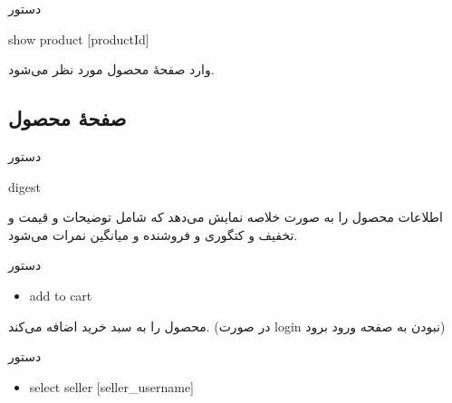 \documentclass[]{article}
\begin{document}
\begin{mybox}[colback=yellow]{دستور}

\begin{latin}

show product [productId]

\end{latin}

\end{mybox}

وارد صفحهٔ محصول مورد نظر می‌شود.

\newpage
\subsection*{{\titr صفحهٔ محصول}}



\begin{mybox}[colback=yellow]{دستور}

\begin{latin}

digest

\end{latin}

\end{mybox}

اطلاعات محصول را به صورت خلاصه نمایش می‌دهد که شامل توضیحات و قیمت و تخفیف و کتگوری و فروشنده و میانگین نمرات می‌شود.


\begin{mybox}[colback=brilliantlavender]{دستور}

\begin{latin}

\begin{itemize}[label = {$\Rightarrow$}]

\item
add to cart

\end{itemize}

\end{latin}

\end{mybox}

محصول را به سبد خرید اضافه می‌کند. (در صورت login نبودن به صفحه ورود برود)


\begin{mybox}[colback=brilliantlavender]{دستور}

\begin{latin}

\begin{itemize}[label = {$\Rightarrow$}]

\item
select seller [seller\_username]

\end{itemize}

\end{latin}

\end{mybox}
\end{document}
